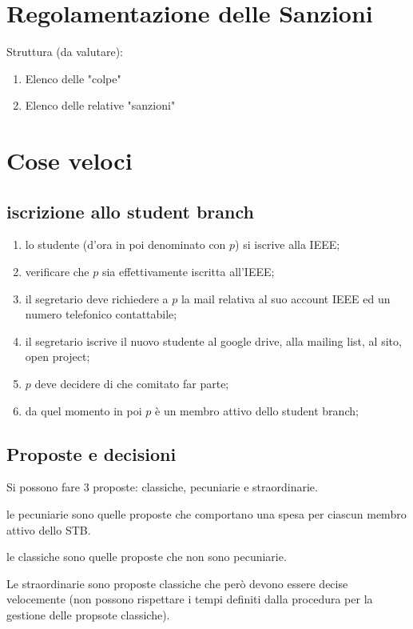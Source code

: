 \documentclass[pdf]{article}
\theoremstyle{definition}
\begin{document}
\section{Regolamentazione delle Sanzioni}

Struttura (da valutare):
\begin{enumerate}
	\item Elenco delle "colpe"
	\item Elenco delle relative "sanzioni"
\end{enumerate}

\section{Cose veloci}

\subsection{iscrizione allo student branch}

\begin{enumerate}
	\item lo studente (d'ora in poi denominato con $p$) si iscrive alla IEEE;
	\item verificare che $p$ sia effettivamente iscritta all’IEEE;
	\item il segretario deve richiedere a $p$ la mail relativa al suo account IEEE ed un numero telefonico contattabile;
	\item il segretario iscrive il nuovo studente al google drive, alla mailing list, al sito, open project;
	\item $p$ deve decidere di che comitato far parte;
	\item da quel momento in poi $p$ è un membro attivo dello student branch;
\end{enumerate}

\subsection{Proposte e decisioni}

Si possono fare 3 proposte: classiche, pecuniarie e straordinarie.

le pecuniarie sono quelle proposte che comportano una spesa per ciascun membro attivo dello STB.

le classiche sono quelle proposte che non sono pecuniarie.

Le straordinarie sono proposte classiche che però devono essere decise velocemente (non possono rispettare i tempi definiti dalla procedura per la gestione delle propsote classiche).
\end{document}
